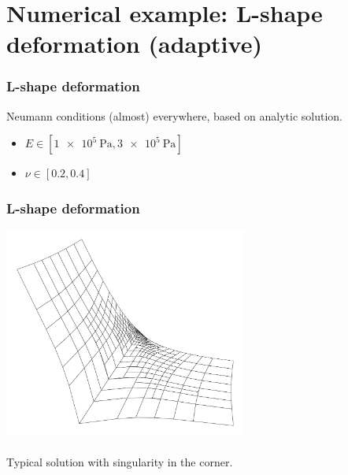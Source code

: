 \documentclass{beamer}
\begin{document}
\section{Numerical example: L-shape deformation (adaptive)}

\begin{frame}
  \frametitle{L-shape deformation}

  \begin{center}
  \end{center}

  Neumann conditions (almost) everywhere, based on analytic solution.

  \begin{itemize}
  \item $E \in [\SI{1e5}{\pascal}, \SI{3e5}{\pascal}]$
  \item $\nu \in [0.2, 0.4]$
  \end{itemize}
\end{frame}

\begin{frame}
  \frametitle{L-shape deformation}

  \begin{center}
    \includegraphics[width=0.6\textwidth]{lshape/sol}
    \\~\\
    Typical solution with singularity in the corner.
  \end{center}
\end{frame}
\end{document}
